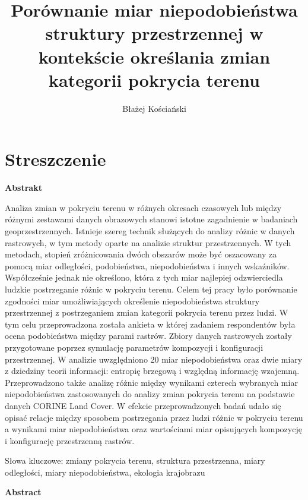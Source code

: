 \documentclass{amuthesis}
\author{Błażej Kościański}
\title{Porównanie miar niepodobieństwa struktury przestrzennej w
kontekście określania zmian kategorii pokrycia terenu}
\begin{document}

\titlepage


\hypertarget{streszczenie}{%
\chapter*{Streszczenie}\label{streszczenie}}


\textbf{Abstrakt}

Analiza zmian w pokryciu terenu w różnych okresach czasowych lub między
różnymi zestawami danych obrazowych stanowi istotne zagadnienie w
badaniach geoprzestrzennych. Istnieje szereg technik służących do
analizy różnic w danych rastrowych, w tym metody oparte na analizie
struktur przestrzennych. W tych metodach, stopień zróżnicowania dwóch
obszarów może być oszacowany za pomocą miar odległości, podobieństwa,
niepodobieństwa i innych wskaźników. Współcześnie jednak nie określono,
która z tych miar najlepiej odzwierciedla ludzkie postrzeganie różnic w
pokryciu terenu. Celem tej pracy było porównanie zgodności miar
umożliwiających określenie niepodobieństwa struktury przestrzennej z
postrzeganiem zmian kategorii pokrycia terenu przez ludzi. W tym celu
przeprowadzona została ankieta w której zadaniem respondentów była ocena
podobieństwa między parami rastrów. Zbiory danych rastrowych zostały
przygotowane poprzez symulację parametrów kompozycji i konfiguracji
przestrzennej. W analizie uwzględniono 20 miar niepodobieństwa oraz dwie
miary z dziedziny teorii informacji: entropię brzegową i względną
informację wzajemną. Przeprowadzono także analizę różnic między wynikami
czterech wybranych miar niepodobieństwa zastosowanych do analizy zmian
pokrycia terenu na podstawie danych CORINE Land Cover. W efekcie
przeprowadzonych badań udało się opisać relacje między sposobem
postrzegania przez ludzi różnic w pokryciu terenu a wynikami miar
niepodobieństwa oraz wartościami miar opisujących kompozycję i
konfigurację przestrzenną rastrów.

Słowa kluczowe: zmiany pokrycia terenu, struktura przestrzenna, miary
odległości, miary niepodobieństwa, ekologia krajobrazu

\newpage

\textbf{Abstract}
\end{document}
